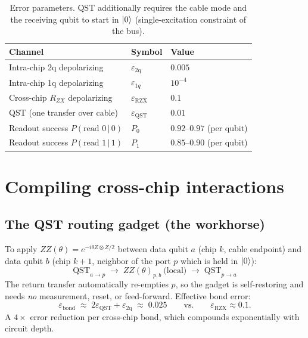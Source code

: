 \documentclass[11pt]{article}
\newcommand{\eqst}{\varepsilon_{\mathrm{QST}}}
\newcommand{\erzx}{\varepsilon_{\mathrm{RZX}}}
\newcommand{\eloc}{\varepsilon_{\mathrm{2q}}}
\begin{document}
\begin{table}[h]
\centering
\begin{tabular}{lll}
\toprule
Channel & Symbol & Value \\
\midrule
Intra-chip 2q depolarizing & $\eloc$ & $0.005$ \\
Intra-chip 1q depolarizing & $\varepsilon_{1q}$ & $10^{-4}$ \\
Cross-chip $R_{ZX}$ depolarizing & $\erzx$ & $0.1$ \\
QST (one transfer over cable) & $\eqst$ & $0.01$ \\
Readout success $P(\text{read }0\,|\,0)$ & $P_0$ & $0.92$--$0.97$ (per qubit) \\
Readout success $P(\text{read }1\,|\,1)$ & $P_1$ & $0.85$--$0.90$ (per qubit) \\
\bottomrule
\end{tabular}
\caption{Error parameters. QST additionally requires the cable mode and the
receiving qubit to start in $\ket{0}$ (single-excitation constraint of the bus).}
\label{tab:noise}
\end{table}

\section{Compiling cross-chip interactions}
\label{sec:compile}

\subsection{The QST routing gadget (the workhorse)}

To apply $ZZ(\theta)=e^{-i\theta Z\otimes Z/2}$ between data qubit $a$ (chip
$k$, cable endpoint) and data qubit $b$ (chip $k{+}1$, neighbor of the port
$p$ which is held in $\ket{0}$):
\begin{equation}
  \boxed{\;
  \mathrm{QST}_{a\to p}
  \;\longrightarrow\;
  ZZ(\theta)_{p,b}\ \text{(local)}
  \;\longrightarrow\;
  \mathrm{QST}_{p\to a}
  \;}
\label{eq:gadget}
\end{equation}
The return transfer automatically re-empties $p$, so the gadget is
self-restoring and needs \emph{no} measurement, reset, or feed-forward.
Effective bond error:
\begin{equation}
  \varepsilon_{\mathrm{bond}} \;\approx\; 2\eqst + \eloc \;\approx\; 0.025
  \qquad \text{vs.} \qquad \erzx \approx 0.1 .
\end{equation}
A $4\times$ error reduction per cross-chip bond, which compounds
exponentially with circuit depth.
\end{document}
